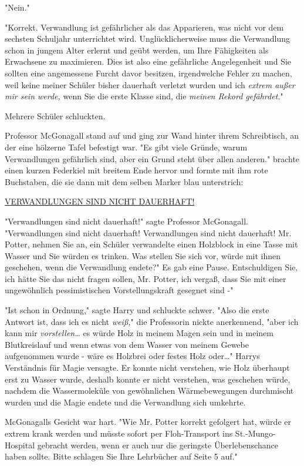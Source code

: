 {"Nein."

"Korrekt. Verwandlung ist gefährlicher als das Apparieren, was nicht vor dem sechsten Schuljahr unterrichtet wird. Unglücklicherweise muss die Verwandlung schon in jungem Alter erlernt und geübt werden, um Ihre Fähigkeiten als Erwachsene zu maximieren. Dies ist also eine gefährliche Angelegenheit und Sie sollten eine angemessene Furcht davor besitzen, irgendwelche Fehler zu machen, weil keine meiner Schüler bisher dauerhaft verletzt wurden und ich \emph{extrem außer mir sein werde,} wenn Sie die erste Klasse sind, die \emph{meinen Rekord gefährdet.}"

Mehrere Schüler schluckten.

Professor McGonagall stand auf und ging zur Wand hinter ihrem Schreibtisch, an der eine hölzerne Tafel befestigt war. "Es gibt viele Gründe, warum Verwandlungen gefährlich sind, aber ein Grund steht über allen anderen." brachte einen kurzen Federkiel mit breitem Ende hervor und formte mit ihm rote Buchstaben, die sie dann mit dem selben Marker blau unterstrich:

\uline{VERWANDLUNGEN SIND NICHT DAUERHAFT!}

"Verwandlungen sind nicht dauerhaft!" sagte Professor McGonagall. "Verwandlungen sind nicht dauerhaft! Verwandlungen sind nicht dauerhaft! Mr. Potter, nehmen Sie an, ein Schüler verwandelte einen Holzblock in eine Tasse mit Wasser und Sie würden es trinken. Was stellen Sie sich vor, würde mit ihnen geschehen, wenn die Verwandlung endete?" Es gab eine Pause. Entschuldigen Sie, ich hätte Sie das nicht fragen sollen, Mr. Potter, ich vergaß, dass Sie mit einer ungewöhnlich pessimistischen Vorstellungskraft gesegnet sind -"

"Ist schon in Ordnung," sagte Harry und schluckte schwer. "Also die erste Antwort ist, dass ich es nicht \emph{weiß,}" die Professorin nickte anerkennend, "aber ich kann mir \emph{vorstellen…} es würde Holz in meinem Magen sein und in meinem Blutkreislauf und wenn etwas von dem Wasser von meinem Gewebe aufgenommen wurde - wäre es Holzbrei oder festes Holz oder…" Harrys Verständnis für Magie versagte. Er konnte nicht verstehen, wie Holz überhaupt erst zu Wasser wurde, deshalb konnte er nicht verstehen, was geschehen würde, nachdem die Wassermoleküle von gewöhnlichen Wärmebewegungen durchmischt wurden und die Magie endete und die Verwandlung sich umkehrte.

McGonagalls Gesicht war hart. "Wie Mr. Potter korrekt gefolgert hat, würde er extrem krank werden und müsste sofort per Floh-Transport ins St.-Mungo-Hospital gebracht werden, wenn er auch nur die geringste Überlebenschance haben sollte. Bitte schlagen Sie Ihre Lehrbücher auf Seite 5 auf."

}
